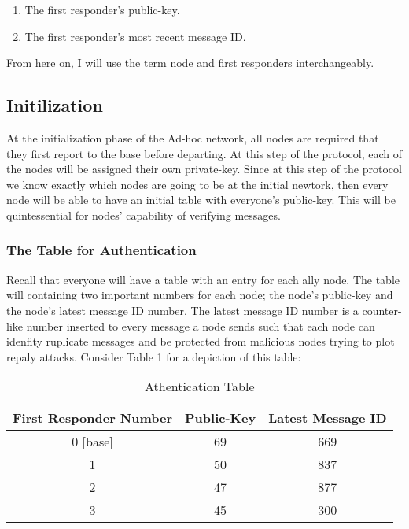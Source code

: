 \documentclass[letterpaper]{article}
\begin{document}
\begin{enumerate}
  \item The first responder's public-key. 
  \item The first responder's most recent message ID.
\end{enumerate}

From here on, I will use the term node and first responders interchangeably.

\subsection{Initilization}
At the initialization phase of the Ad-hoc network, all nodes are required that they first report to the base before departing. 
At this step of the protocol, each of the nodes will be assigned their own private-key. 
Since at this step of the protocol we know exactly which nodes are going to be at the initial newtork, then every node will be able to have an initial table with everyone's public-key. 
This will be quintessential for nodes' capability of verifying messages.

\subsubsection{The Table for Authentication}
Recall that everyone will have a table with an entry for each ally node. The table will containing two important numbers for each node; the node's public-key and the node's latest message ID number. The latest message ID number is a counter-like number inserted to every message a node sends such that each node can idenfity ruplicate messages and be protected from malicious nodes trying to plot repaly attacks. Consider Table 1 for a depiction of this table:

\begin{table}[ht]
\caption{Athentication Table} %
\centering %
\begin{tabular}{c c c } %
\hline
\hline %
First Responder Number & Public-Key & Latest Message ID  \\[0.5ex] %
\hline %
0 [base] & 69 & 669\\
1 & 50 & 837\\
2 & 47 & 877 \\
3 & 45 & 300\\ [1ex]
\hline
\end{tabular}
\label{table:nonlin}
\end{table}
\end{document}
